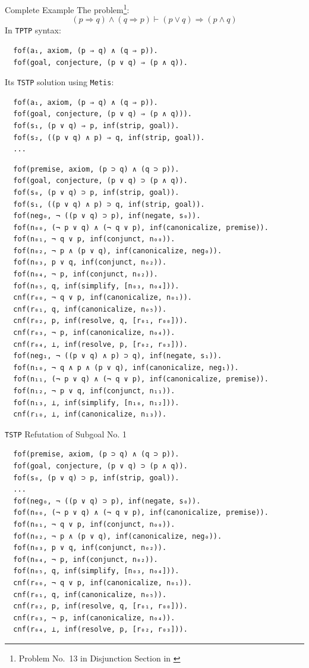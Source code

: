 \documentclass[10pt, xetex, hyperref={pdfpagelabels=false}]{beamer}
\newcommand{\prg}[1]{\texttt{#1}\xspace}
\newcommand{\Metis}{\prg{Metis}}
\newcommand{\len}[1]{\texttt{#1}\xspace}
\newcommand{\TPTP}{\len{TPTP}}
\newcommand{\TSTP}{\len{TSTP}}
\begin{document}
\begin{frame}[fragile]{Complete Example}
The problem\footnote{Problem No.~13 in Disjunction Section in \cite{Prieto-Cubides2017}}:
\begin{equation*}
(p \Rightarrow q) \wedge (q \Rightarrow p) ⊢ (p \vee q) \Rightarrow (p \wedge q)
\end{equation*}
In \TPTP syntax:
\begin{verbatim}
  fof(a₁, axiom, (p ⇒ q) ∧ (q ⇒ p)).
  fof(goal, conjecture, (p ∨ q) ⇒ (p ∧ q)).
\end{verbatim}
Its \TSTP solution using \Metis:
\begin{verbatim}
  fof(a₁, axiom, (p ⇒ q) ∧ (q ⇒ p)).
  fof(goal, conjecture, (p ∨ q) ⇒ (p ∧ q))).
  fof(s₁, (p ∨ q) ⇒ p, inf(strip, goal)).
  fof(s₂, ((p ∨ q) ∧ p) ⇒ q, inf(strip, goal)).
  ...
\end{verbatim}
\end{frame}

\begin{frame}
\begin{verbatim}
  fof(premise, axiom, (p ⊃ q) ∧ (q ⊃ p)).
  fof(goal, conjecture, (p ∨ q) ⊃ (p ∧ q)).
  fof(s₀, (p ∨ q) ⊃ p, inf(strip, goal)).
  fof(s₁, ((p ∨ q) ∧ p) ⊃ q, inf(strip, goal)).
  fof(neg₀, ¬ ((p ∨ q) ⊃ p), inf(negate, s₀)).
  fof(n₀₀, (¬ p ∨ q) ∧ (¬ q ∨ p), inf(canonicalize, premise)).
  fof(n₀₁, ¬ q ∨ p, inf(conjunct, n₀₀)).
  fof(n₀₂, ¬ p ∧ (p ∨ q), inf(canonicalize, neg₀)).
  fof(n₀₃, p ∨ q, inf(conjunct, n₀₂)).
  fof(n₀₄, ¬ p, inf(conjunct, n₀₂)).
  fof(n₀₅, q, inf(simplify, [n₀₃, n₀₄])).
  cnf(r₀₀, ¬ q ∨ p, inf(canonicalize, n₀₁)).
  cnf(r₀₁, q, inf(canonicalize, n₀₅)).
  cnf(r₀₂, p, inf(resolve, q, [r₀₁, r₀₀])).
  cnf(r₀₃, ¬ p, inf(canonicalize, n₀₄)).
  cnf(r₀₄, ⊥, inf(resolve, p, [r₀₂, r₀₃])).
  fof(neg₁, ¬ ((p ∨ q) ∧ p) ⊃ q), inf(negate, s₁)).
  fof(n₁₀, ¬ q ∧ p ∧ (p ∨ q), inf(canonicalize, neg₁)).
  fof(n₁₁, (¬ p ∨ q) ∧ (¬ q ∨ p), inf(canonicalize, premise)).
  fof(n₁₂, ¬ p ∨ q, inf(conjunct, n₁₁)).
  fof(n₁₃, ⊥, inf(simplify, [n₁₀, n₁₂])).
  cnf(r₁₀, ⊥, inf(canonicalize, n₁₃)).
\end{verbatim}
\end{frame}

\begin{frame}[fragile]{\TSTP Refutation of Subgoal No. 1}
\begin{verbatim}
  fof(premise, axiom, (p ⊃ q) ∧ (q ⊃ p)).
  fof(goal, conjecture, (p ∨ q) ⊃ (p ∧ q)).
  fof(s₀, (p ∨ q) ⊃ p, inf(strip, goal)).
  ...
  fof(neg₀, ¬ ((p ∨ q) ⊃ p), inf(negate, s₀)).
  fof(n₀₀, (¬ p ∨ q) ∧ (¬ q ∨ p), inf(canonicalize, premise)).
  fof(n₀₁, ¬ q ∨ p, inf(conjunct, n₀₀)).
  fof(n₀₂, ¬ p ∧ (p ∨ q), inf(canonicalize, neg₀)).
  fof(n₀₃, p ∨ q, inf(conjunct, n₀₂)).
  fof(n₀₄, ¬ p, inf(conjunct, n₀₂)).
  fof(n₀₅, q, inf(simplify, [n₀₃, n₀₄])).
  cnf(r₀₀, ¬ q ∨ p, inf(canonicalize, n₀₁)).
  cnf(r₀₁, q, inf(canonicalize, n₀₅)).
  cnf(r₀₂, p, inf(resolve, q, [r₀₁, r₀₀])).
  cnf(r₀₃, ¬ p, inf(canonicalize, n₀₄)).
  cnf(r₀₄, ⊥, inf(resolve, p, [r₀₂, r₀₃])).
\end{verbatim}
\end{frame}
\end{document}

